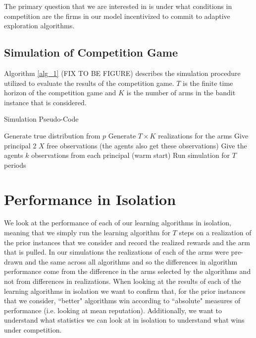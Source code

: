 \documentclass{article}
\theoremstyle{definition}
\begin{document}
The primary question that we are interested in is under what conditions in competition are the firms in our model incentivized to commit to adaptive exploration algorithms.

\subsection{Simulation of Competition Game}
Algorithm \ref{alg_1} (FIX TO BE FIGURE) describes the simulation procedure utilized to evaluate the results of the competition game. $T$ is the finite time horizon of the competition game and $K$ is the number of arms in the bandit instance that is considered.

\begin{algorithm}
\caption{Simulation Pseudo-Code}
\begin{algorithmic}[1]
\State Generate true distribution from $p$
\State Generate $T \times K$ realizations for the arms 
				\State Give principal 2 $X$ free observations (the agents also get these observations)				
				\State Give the agents $k$ observations from each principal (warm start)
				\State Run simulation for $T$ periods
			\EndFor
		\EndFor
	\EndFor
\EndFor
\end{algorithmic}
\label{alg_1}
\end{algorithm}

\section{Performance in Isolation}
\label{S:5}

We look at the performance of each of our learning algorithms in isolation, meaning that we simply run the learning algorithm for $T$ steps on a realization of the prior instances that we consider and record the realized rewards and the arm that is pulled. In our simulations the realizations of each of the arms were pre-drawn and the same across all algorithms and so the differences in algorithm performance come from the difference in the arms selected by the algorithms and not from differences in realizations. When looking at the results of each of the learning algorithms in isolation we want to confirm that, for the prior instances that we consider, ``better" algorithms win according to ``absolute" measures of performance (i.e. looking at mean reputation). Additionally, we want to understand what statistics we can look at in isolation to understand what wins under competition.
\end{document}
